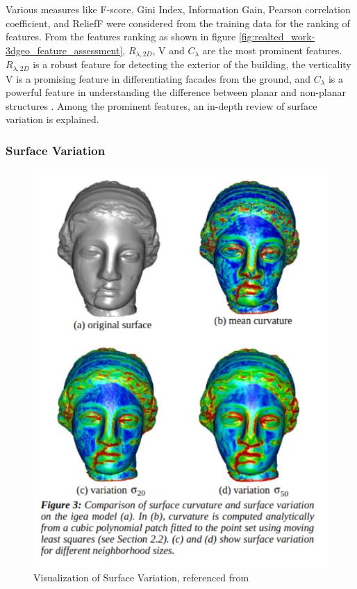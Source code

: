 Various measures like F-score, Gini Index, Information Gain, Pearson correlation coefficient, and ReliefF were considered from the training data for the ranking of features. From the features ranking as shown in figure \ref{fig:realted_work-3dgeo_feature_assessment}, \( R_{\lambda,2D} \), V and \(C_{\lambda} \) are the most prominent features. \( R_{\lambda,2D} \) is a robust feature for detecting the exterior of the building, the verticality V is a promising feature in differentiating facades from the ground, and \(C_{\lambda} \) is a powerful feature in understanding the difference between planar and non-planar structures \parencite{weinmann2013feature}. Among the prominent features, an in-depth review of surface variation is explained.

\subsubsection{Surface Variation}

\begin{figure}[htbp]
    \centering
    \includegraphics[width=0.6\linewidth]{97_graphics/related_work/surf_variation_with_description.pdf}
    \caption{Visualization of Surface Variation, referenced from \parencite{pauly2002efficient}}
    \label{fig:related_work-surface_variation_visualize}
\end{figure}

